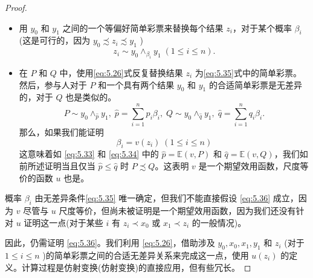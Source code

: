 \begin{proof}
\begin{itemize}
\item 用 \({y}_{0}\) 和 \({y}_{1}\) 之间的一个等偏好简单彩票来替换每个结果 \({z}_{i}\)，对于某个概率 \({\beta }_{i}\) (这是可行的，因为 \({y}_{0} \precsim  {z}_{i} \precsim  {y}_{1}\) )
\begin{equation}
\label{eq:5.35}
{z}_{i} \sim  {y}_{0}{ \land  }_{{\beta }_{i}}{y}_{1}\;\left( {1 \leq  i \leq  n}\right) .
\end{equation}

\item 在 \(P\) 和 \(Q\) 中，使用\eqref{eq:5.26}式反复替换结果 \({z}_{i}\) 为\eqref{eq:5.35}式中的简单彩票。然后，参与人对于 \(P\) 和一个具有两个结果 \({y}_{0}\) 和 \({y}_{1}\) 的合适简单彩票是无差异的，对于 \(Q\) 也是类似的。
\[
P \sim  {y}_{0}{ \land  }_{\widehat{p}}{y}_{1},\;\widehat{p} = \mathop{\sum }\limits_{{i = 1}}^{n}{p}_{i}{\beta }_{i},\;Q \sim  {y}_{0}{ \land  }_{\widehat{q}}{y}_{1},\;\widehat{q} = \mathop{\sum }\limits_{{i = 1}}^{n}{q}_{i}{\beta }_{i}.
\]
那么，如果我们能证明
\begin{equation}
\label{eq:5.36}
{\beta }_{i} = v\left( {z}_{i}\right) \;\left( {1 \leq  i \leq  n}\right)
\end{equation}
这意味着如 \eqref{eq:5.33} 和 \eqref{eq:5.34} 中的 \(\widehat{p} = \mathbb{E}\left( {v,P}\right)\) 和 \(\widehat{q} = \mathbb{E}\left( {v,Q}\right)\)，我们如前所述证明当且仅当 \(\widehat{p} \leq  \widehat{q}\) 时 \(P \precsim  Q\)。这表明 \(v\) 是一个期望效用函数，尺度等价的函数 \(u\) 也是。
\end{itemize}

概率 \({\beta }_{i}\) 由无差异条件\eqref{eq:5.35} 唯一确定，但我们不能直接假设 \eqref{eq:5.36} 成立，因为 \(v\) 尽管与 \(u\) 尺度等价，但尚未被证明是一个期望效用函数，因为我们还没有针对 \(u\) 证明这一点(对于某些 \(i\) 有 \({z}_{i} \prec  {x}_{0}\) 或 \({x}_{1} \prec  {z}_{i}\) 的一般情况)。

因此，仍需证明 \eqref{eq:5.36}。我们利用 \eqref{eq:5.26}，借助涉及 \({y}_{0},{x}_{0},{x}_{1},{y}_{1}\) 和 \({z}_{i}\) (对于 \(1 \leq  i \leq  n\) )的简单彩票之间的合适无差异关系来完成这一点，使用 \(u\left( {z}_{i}\right)\) 的定义。计算过程是仿射变换(仿射变换)的直接应用，但有些冗长。


\end{proof}
